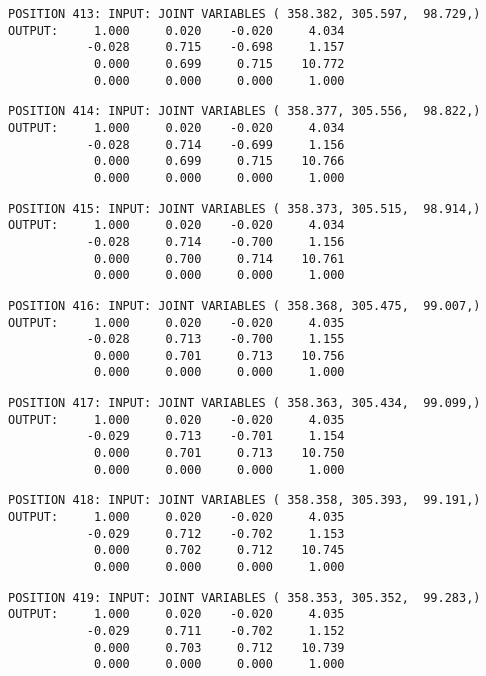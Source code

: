 \begin{verbatim}
POSITION 413: INPUT: JOINT VARIABLES ( 358.382, 305.597,  98.729,)
OUTPUT:     1.000     0.020    -0.020     4.034
           -0.028     0.715    -0.698     1.157
            0.000     0.699     0.715    10.772
            0.000     0.000     0.000     1.000
\end{verbatim} \pagebreak[1]\begin{verbatim}
POSITION 414: INPUT: JOINT VARIABLES ( 358.377, 305.556,  98.822,)
OUTPUT:     1.000     0.020    -0.020     4.034
           -0.028     0.714    -0.699     1.156
            0.000     0.699     0.715    10.766
            0.000     0.000     0.000     1.000
\end{verbatim} \pagebreak[1]\begin{verbatim}
POSITION 415: INPUT: JOINT VARIABLES ( 358.373, 305.515,  98.914,)
OUTPUT:     1.000     0.020    -0.020     4.034
           -0.028     0.714    -0.700     1.156
            0.000     0.700     0.714    10.761
            0.000     0.000     0.000     1.000
\end{verbatim} \pagebreak[1]\begin{verbatim}
POSITION 416: INPUT: JOINT VARIABLES ( 358.368, 305.475,  99.007,)
OUTPUT:     1.000     0.020    -0.020     4.035
           -0.028     0.713    -0.700     1.155
            0.000     0.701     0.713    10.756
            0.000     0.000     0.000     1.000
\end{verbatim} \pagebreak[1]\begin{verbatim}
POSITION 417: INPUT: JOINT VARIABLES ( 358.363, 305.434,  99.099,)
OUTPUT:     1.000     0.020    -0.020     4.035
           -0.029     0.713    -0.701     1.154
            0.000     0.701     0.713    10.750
            0.000     0.000     0.000     1.000
\end{verbatim} \pagebreak[1]\begin{verbatim}
POSITION 418: INPUT: JOINT VARIABLES ( 358.358, 305.393,  99.191,)
OUTPUT:     1.000     0.020    -0.020     4.035
           -0.029     0.712    -0.702     1.153
            0.000     0.702     0.712    10.745
            0.000     0.000     0.000     1.000
\end{verbatim} \pagebreak[1]\begin{verbatim}
POSITION 419: INPUT: JOINT VARIABLES ( 358.353, 305.352,  99.283,)
OUTPUT:     1.000     0.020    -0.020     4.035
           -0.029     0.711    -0.702     1.152
            0.000     0.703     0.712    10.739
            0.000     0.000     0.000     1.000
\end{verbatim} \pagebreak[1]\begin{verbatim}

\end{verbatim}
